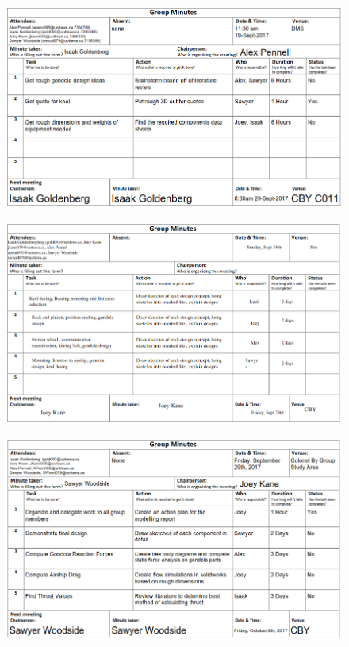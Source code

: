 \documentclass[../main.tex]{subfiles}
\begin{document}
		\begin{figure}[H]
			\centering
			\includegraphics[height=0.8\textheight]{img/minutes/2017-09-19.PNG}
		\end{figure}
			\begin{figure}[H]
			\centering
			\includegraphics[height=0.8\textheight]{img/minutes/2017-09-24.PNG}
		\end{figure}
		\begin{figure}[H]
			\centering
			\includegraphics[height=0.8\textheight]{img/minutes/2017-09-29.PNG}
		\end{figure}
\end{document}
